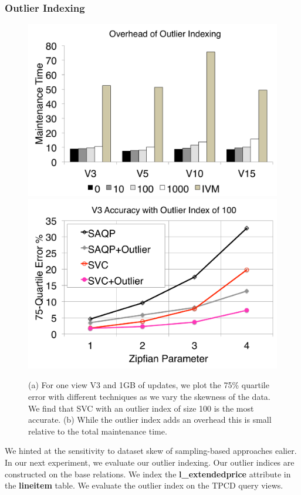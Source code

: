 \subsubsection{Outlier Indexing}

\begin{figure}[t]
\centering
 \includegraphics[scale=0.20]{exp/msoi_1.pdf}
 \includegraphics[scale=0.20]{exp/msoi_2.pdf}

 \caption{(a) For one view V3 and 1GB of updates, we plot the 75\% quartile error with different techniques as we vary the skewness of the data. We find that SVC with an outlier index of size 100 is the most accurate. (b) While the outlier index adds an overhead this is small relative to the total maintenance time. \label{exp5-oi}}
\end{figure}
We hinted at the sensitivity to dataset skew of sampling-based approaches ealier.
In our next experiment, we evaluate our outlier indexing.
Our outlier indices are constructed on the base relations.
We index the \textbf{l\_extendedprice} attribute in the \textbf{lineitem} table.
We evaluate the outlier index on the TPCD query views.

